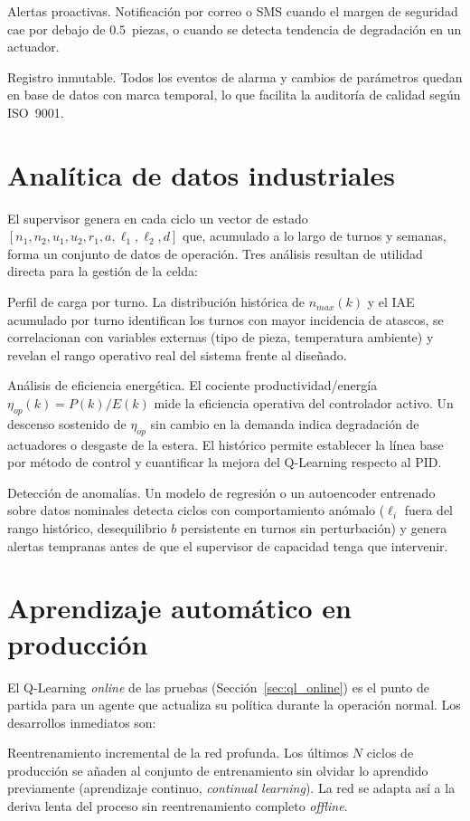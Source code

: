 Alertas proactivas. Notificación por correo o SMS cuando el margen de seguridad cae por debajo de $0.5$~piezas, o cuando se detecta tendencia de degradación en un actuador.

Registro inmutable. Todos los eventos de alarma y cambios de parámetros quedan en base de datos con marca temporal, lo que facilita la auditoría de calidad según ISO~9001.

\section{Analítica de datos industriales}

El supervisor genera en cada ciclo un vector de estado $[n_1, n_2, u_1, u_2, r_1, a, \ell_1, \ell_2, d]$ que, acumulado a lo largo de turnos y semanas, forma un conjunto de datos de operación. Tres análisis resultan de utilidad directa para la gestión de la celda:

Perfil de carga por turno. La distribución histórica de $n_{max}(k)$ y el IAE acumulado por turno identifican los turnos con mayor incidencia de atascos, se correlacionan con variables externas (tipo de pieza, temperatura ambiente) y revelan el rango operativo real del sistema frente al diseñado.

Análisis de eficiencia energética. El cociente productividad/energía $\eta_{op}(k)=P(k)/E(k)$ mide la eficiencia operativa del controlador activo. Un descenso sostenido de $\eta_{op}$ sin cambio en la demanda indica degradación de actuadores o desgaste de la estera. El histórico permite establecer la línea base por método de control y cuantificar la mejora del Q-Learning respecto al PID.

Detección de anomalías. Un modelo de regresión o un autoencoder entrenado sobre datos nominales detecta ciclos con comportamiento anómalo ($\ell_i$ fuera del rango histórico, desequilibrio $b$ persistente en turnos sin perturbación) y genera alertas tempranas antes de que el supervisor de capacidad tenga que intervenir.

\section{Aprendizaje automático en producción}

El Q-Learning \emph{online} de las pruebas (Sección~\ref{sec:ql_online}) es el punto de partida para un agente que actualiza su política durante la operación normal. Los desarrollos inmediatos son:

Reentrenamiento incremental de la red profunda. Los últimos $N$ ciclos de producción se añaden al conjunto de entrenamiento sin olvidar lo aprendido previamente (aprendizaje continuo, \emph{continual learning}). La red se adapta así a la deriva lenta del proceso sin reentrenamiento completo \emph{offline}.

